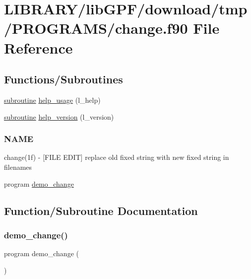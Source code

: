 \hypertarget{change_8f90}{}\section{L\+I\+B\+R\+A\+R\+Y/lib\+G\+P\+F/download/tmp/\+P\+R\+O\+G\+R\+A\+M\+S/change.f90 File Reference}
\label{change_8f90}
\subsection*{Functions/\+Subroutines}
\begin{DoxyCompactItemize}
\item 
\hyperlink{M__stopwatch_83_8txt_acfbcff50169d691ff02d4a123ed70482}{subroutine} \hyperlink{change_8f90_a3e09a3b52ee8fb04eeb93fe5761626a8}{help\+\_\+usage} (l\+\_\+help)
\item 
\hyperlink{M__stopwatch_83_8txt_acfbcff50169d691ff02d4a123ed70482}{subroutine} \hyperlink{change_8f90_a39c21619b08a3c22f19e2306efd7f766}{help\+\_\+version} (l\+\_\+version)
\begin{DoxyCompactList}\small\item\em \subsubsection*{N\+A\+ME}

change(1f) -\/ \mbox{[}F\+I\+LE E\+D\+IT\mbox{]} replace old fixed string with new fixed string in filenames \end{DoxyCompactList}\item 
program \hyperlink{change_8f90_a5fa62001f03b62e71cd6fa2a04f697b0}{demo\+\_\+change}
\end{DoxyCompactItemize}


\subsection{Function/\+Subroutine Documentation}
\mbox{\label{change_8f90_a5fa62001f03b62e71cd6fa2a04f697b0}} 
\subsubsection{\texorpdfstring{demo\+\_\+change()}{demo\_change()}}
{\footnotesize\ttfamily program demo\+\_\+change (\begin{DoxyParamCaption}{ }\end{DoxyParamCaption})}



